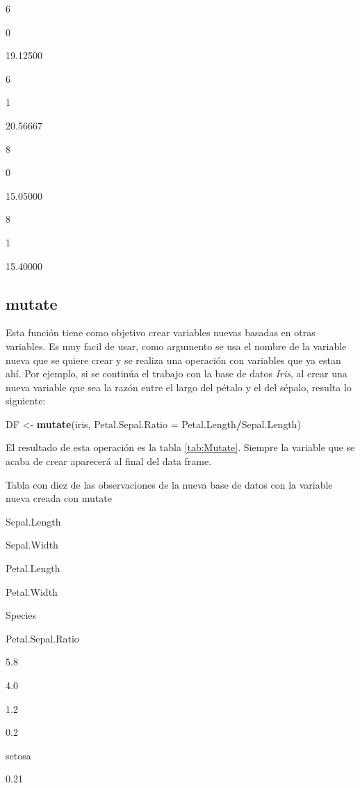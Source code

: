 \documentclass[]{book}
\newenvironment{Shaded}{\begin{snugshade}}{\end{snugshade}}
\newcommand{\DataTypeTok}[1]{\textcolor[rgb]{0.13,0.29,0.53}{#1}}
\newcommand{\KeywordTok}[1]{\textcolor[rgb]{0.13,0.29,0.53}{\textbf{#1}}}
\newcommand{\NormalTok}[1]{#1}
\newcommand{\OperatorTok}[1]{\textcolor[rgb]{0.81,0.36,0.00}{\textbf{#1}}}
\newcommand{\StringTok}[1]{\textcolor[rgb]{0.31,0.60,0.02}{#1}}
\begin{document}
6

0

19.12500

6

1

20.56667

8

0

15.05000

8

1

15.40000

\hypertarget{mutate}{%
\subsection{mutate}\label{mutate}}

Esta función tiene como objetivo crear variables nuevas basadas en otras
variables. Es muy facil de usar, como argumento se usa el nombre de la
variable nueva que se quiere crear y se realiza una operación con
variables que ya estan ahí. Por ejemplo, si se continúa el trabajo con
la base de datos \emph{Iris}, al crear una nueva variable que sea la
razón entre el largo del pétalo y el del sépalo, resulta lo siguiente:

\begin{Shaded}
\begin{Highlighting}[]
\NormalTok{DF <-}\StringTok{ }\KeywordTok{mutate}\NormalTok{(iris, }\DataTypeTok{Petal.Sepal.Ratio =}\NormalTok{ Petal.Length}\OperatorTok{/}\NormalTok{Sepal.Length)}
\end{Highlighting}
\end{Shaded}

El resultado de esta operación es la tabla \ref{tab:Mutate}. Siempre la
variable que se acaba de crear aparecerá al final del data frame.

\label{tab:Mutate}Tabla con diez de las observaciones de la nueva base de
datos con la variable nueva creada con mutate

Sepal.Length

Sepal.Width

Petal.Length

Petal.Width

Species

Petal.Sepal.Ratio

5.8

4.0

1.2

0.2

setosa

0.21
\end{document}
